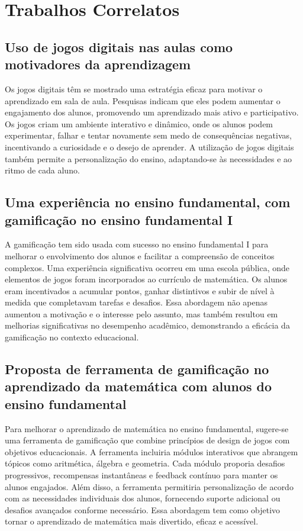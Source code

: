 \chapter{Trabalhos Correlatos}\label{chp:conc}


\section{Uso de jogos digitais nas aulas como motivadores da aprendizagem}

Os jogos digitais têm se mostrado uma estratégia eficaz para motivar o aprendizado em sala de aula. Pesquisas indicam que eles podem aumentar o engajamento dos alunos, promovendo um aprendizado mais ativo e participativo. Os jogos criam um ambiente interativo e dinâmico, onde os alunos podem experimentar, falhar e tentar novamente sem medo de consequências negativas, incentivando a curiosidade e o desejo de aprender. A utilização de jogos digitais também permite a personalização do ensino, adaptando-se às necessidades e ao ritmo de cada aluno.

\cite{landers2017}


\section{Uma experiência no ensino fundamental, com gamificação no ensino fundamental I}

A gamificação tem sido usada com sucesso no ensino fundamental I para melhorar o envolvimento dos alunos e facilitar a compreensão de conceitos complexos. Uma experiência significativa ocorreu em uma escola pública, onde elementos de jogos foram incorporados ao currículo de matemática. Os alunos eram incentivados a acumular pontos, ganhar distintivos e subir de nível à medida que completavam tarefas e desafios. Essa abordagem não apenas aumentou a motivação e o interesse pelo assunto, mas também resultou em melhorias significativas no desempenho acadêmico, demonstrando a eficácia da gamificação no contexto educacional.

\cite{kapp2012gamification}

\section{Proposta de ferramenta de gamificação no aprendizado da matemática com alunos do ensino fundamental}

Para melhorar o aprendizado de matemática no ensino fundamental, sugere-se uma ferramenta de gamificação que combine princípios de design de jogos com objetivos educacionais. A ferramenta incluiria módulos interativos que abrangem tópicos como aritmética, álgebra e geometria. Cada módulo proporia desafios progressivos, recompensas instantâneas e feedback contínuo para manter os alunos engajados. Além disso, a ferramenta permitiria personalização de acordo com as necessidades individuais dos alunos, fornecendo suporte adicional ou desafios avançados conforme necessário. Essa abordagem tem como objetivo tornar o aprendizado de matemática mais divertido, eficaz e acessível.

\cite{tolomei2017gamificacao}


